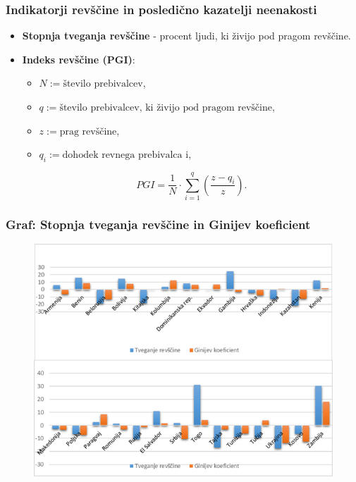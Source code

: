 \documentclass[10pt]{beamer}
\begin{document}
\begin{frame}
\frametitle{Indikatorji revščine in posledično kazatelji neenakosti}
\begin{itemize}
\item \textbf{Stopnja tveganja revščine} - procent ljudi, ki živijo pod pragom revščine.

\item \textbf{Indeks revščine (PGI)}:
\begin{itemize}
\item $N := \textrm{število prebivalcev}$,
\item $q := \textrm{število prebivalcev, ki živijo pod pragom revščine}$,
\item $z := \textrm{prag revščine}$,
\item $q_i := \textrm{dohodek revnega prebivalca i}$,
\end{itemize}
$$
PGI = \frac{1}{N} \cdot \sum_{i=1}^q (\frac{z-q_i}{z}).
$$
\end{itemize}
\end{frame}


\begin{frame}
\frametitle{Graf: Stopnja tveganja revščine in Ginijev koeficient}
\begin{figure}
\includegraphics[scale = 0.71]{./slike/gini_revscina3.png}
\end{figure}

\end{frame}
\end{document}
